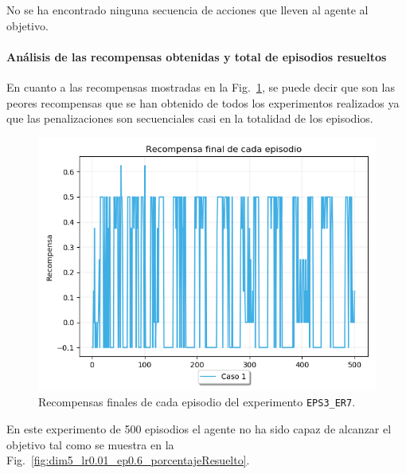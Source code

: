 No se ha encontrado ninguna secuencia de acciones que lleven al agente al objetivo.

\paragraph{Análisis de las recompensas obtenidas y total de episodios resueltos} 

En cuanto a las recompensas mostradas en la Fig.~\ref{fig:dim5_lr0.01_ep0.6_recompensa}, se puede decir que son las peores recompensas que se han obtenido de todos los experimentos realizados ya que las penalizaciones son secuenciales casi en la totalidad de los episodios. \\

\begin{figure}
    \centering
    \includegraphics[scale=0.4]{cap5_experimentacion/images/dim5_lr0.01_ep0.6_recompensa.png}
    \caption{Recompensas finales de cada episodio del experimento \texttt{EPS3\_ER7}.}
    \label{fig:dim5_lr0.01_ep0.6_recompensa}
\end{figure}

En este experimento de 500 episodios el agente no ha sido capaz de alcanzar el objetivo tal como se muestra en la Fig.~\ref{fig:dim5_lr0.01_ep0.6_porcentajeResuelto}.

